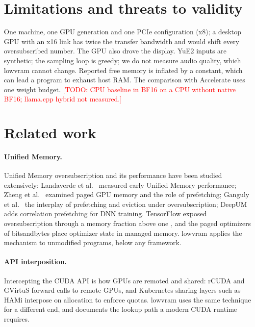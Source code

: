 \documentclass[11pt]{article}
\newcommand{\todo}[1]{\textcolor{red}{[TODO: #1]}}
\begin{document}
\section{Limitations and threats to validity}

One machine, one GPU generation and one PCIe configuration (x8); a desktop GPU with an x16 link
has twice the transfer bandwidth and would shift every oversubscribed number. The GPU also drove
the display. YuE2 inputs are synthetic; the sampling loop is greedy; we do not measure audio
quality, which lowvram cannot change. Reported free memory is inflated by a constant, which can
lead a program to exhaust host RAM. The comparison with Accelerate uses one weight budget.
\todo{CPU baseline in BF16 on a CPU without native BF16; llama.cpp hybrid not measured.}

\section{Related work}

\paragraph{Unified Memory.} Unified Memory oversubscription and its performance have been studied
extensively: Landaverde et al.\ \cite{landaverde2014} measured early Unified Memory performance;
Zheng et al.\ \cite{zheng2016} examined paged GPU memory and the role of prefetching; Ganguly et
al.\ \cite{ganguly2019} the interplay of prefetching and eviction under oversubscription; DeepUM
\cite{deepum} adds correlation prefetching for DNN training. TensorFlow exposed oversubscription
through a memory fraction above one \cite{tf-unified}, and the paged optimizers of
bitsandbytes \cite{qlora} place optimizer state in managed memory. lowvram applies the mechanism to
unmodified programs, below any framework.

\paragraph{API interposition.} Intercepting the CUDA API is how GPUs are remoted and shared:
rCUDA \cite{rcuda} and GVirtuS \cite{gvirtus} forward calls to remote GPUs, and Kubernetes
sharing layers such as HAMi \cite{hami} interpose on allocation to enforce quotas. lowvram uses the
same technique for a different end, and documents the lookup path a modern CUDA runtime requires.
\end{document}
